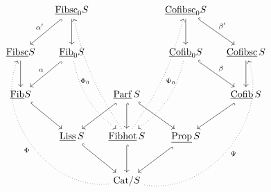 \[
\begin{tikzcd}[column sep=small, row sep=large]
 & \ul{Fibsc}_0S \arrow[dl, hook, "\alpha'"'] \arrow[d] & & \ul{Cofibsc}_0S \arrow[d] \arrow[dr, hook, "\beta'"] & \\
\ul{Fibsc}S \arrow[d] & \ul{Fib}_0S \arrow[dl, hook, "\alpha"'] \arrow[ddr, dotted, bend right=20] & & \ul{Cofib}_0S \arrow[dr, hook, "\beta"] \arrow[ddl, dotted, bend left=20] & \ul{Cofibsc}\,S \arrow[d] \\
\ul{Fib}S \arrow[dr, hook] & & \ul{Parf}\,S \arrow[dl, hook] \arrow[d, hook] \arrow[dr, hook] & & \ul{Cofib}\,S \arrow[dl, hook] \\
 & \ul{Liss}\,S \arrow[dr, hook] & \ul{Fibhot}\,S \arrow[d, hook] \arrow[uuul, dotted, bend left=10, "\Phi_0"] \arrow[uuur, dotted, bend right=10, "\Psi_0"'] & \ul{Prop}\,S \arrow[dl, hook] & \\
 & & \mathrm{Cat}/S \arrow[uuull, dotted, bend left=60, "\Phi"] \arrow[uuurr, dotted, bend right=60, "\Psi"'] & &
\end{tikzcd}
\]

